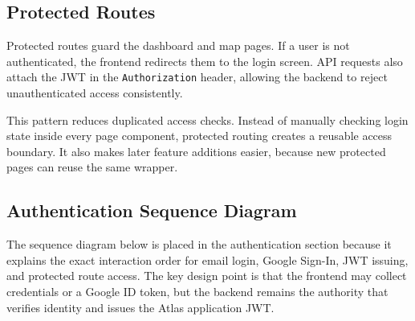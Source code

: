 \documentclass[11pt]{article}
\begin{document}
\subsection*{Protected Routes}

Protected routes guard the dashboard and map pages. If a user is not authenticated, the frontend redirects them to the login screen. API requests also attach the JWT in the \texttt{Authorization} header, allowing the backend to reject unauthenticated access consistently.

This pattern reduces duplicated access checks. Instead of manually checking login state inside every page component, protected routing creates a reusable access boundary. It also makes later feature additions easier, because new protected pages can reuse the same wrapper.

\subsection*{Authentication Sequence Diagram}

The sequence diagram below is placed in the authentication section because it explains the exact interaction order for email login, Google Sign-In, JWT issuing, and protected route access. The key design point is that the frontend may collect credentials or a Google ID token, but the backend remains the authority that verifies identity and issues the Atlas application JWT.
\end{document}
